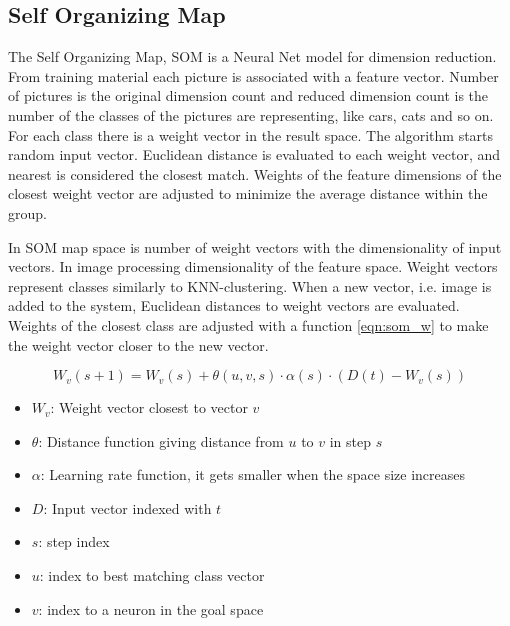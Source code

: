 \documentclass[doc/report.tex]{subfiles}
\begin{document}
\subsection{Self Organizing Map}
The Self Organizing Map, SOM is a Neural Net model for dimension reduction.
From training material each picture is associated with a feature vector. Number
of pictures is the original dimension count and reduced dimension count is the
number of the classes of the pictures are representing, like cars, cats and so
on. For each class there is a weight vector in  the result space. The algorithm
starts random input vector. Euclidean distance is evaluated to each weight
vector, and nearest is considered the closest match. Weights of the feature
dimensions of the closest weight vector are adjusted to minimize the average
distance within the group.

In SOM map space is number of weight vectors with the dimensionality of input
vectors. In image processing dimensionality of the feature space. Weight
vectors represent classes similarly to KNN-clustering. When a new vector, i.e.
image is added to the system, Euclidean distances to weight vectors are
evaluated. Weights of the closest class are adjusted with a function
\eqref{eqn:som_w} to make the weight vector closer to the new vector.

\begin{equation}
    W_v(s+1) = W_v(s) + \theta(u, v, s) \cdot \alpha(s) \cdot (D(t) - W_v(s))
    \label{eqn:som_w}
\end{equation}

\begin{itemize}
    \item $W_v$: Weight vector closest to vector $v$
    \item $\theta$: Distance function giving distance from $u$ to $v$ in step
        $s$
    \item $\alpha$: Learning rate function, it gets smaller when the space size
        increases
    \item $D$: Input vector indexed with $t$
    \item $s$: step index
    \item $u$: index to best matching class vector
    \item $v$: index to a neuron in the goal space
\end{itemize}
\end{document}
